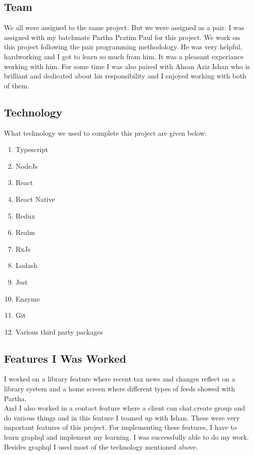 \begin{flushleft}
\subsection{Team}
We all were assigned to the same project. But we were assigned as a pair. I was assigned with my batchmate Partha Pratim Paul for this project. We work on this project following the pair programming methodology. He was very helpful, hardworking and I got to learn so much from him. It was a pleasant experiance working with him. For some time I was also paired with Ahsan Aziz Ishan who is brilliant and dedicated about his responsibility and I enjoyed working with both of them.


\subsection{Technology}
What technology we used to complete this project are given below:

\begin{enumerate}
    \item Typescript
    \item NodeJs
    \item React
    \item React Native
    \item Redux
    \item Realm
    \item RxJs
    \item Lodash
    \item Jest
    \item Enzyme
    \item Git
    \item Various third party packages
 
\end{enumerate}


\subsection{Features I Was Worked}
I worked on  a library feature where recent tax news and changes reflect on a library system and a home screen where different types of feeds showed with Partha.\\ 

And I also worked in a contact feature where a client can chat,create group and do various things and in this feature I teamed up with Ishan. These were very important features of this project. For implementing these features, I have to learn graphql and implement my learning. I was successfully able to do my work. Besides graphql I used most of the technology mentioned above.



\end{flushleft}
